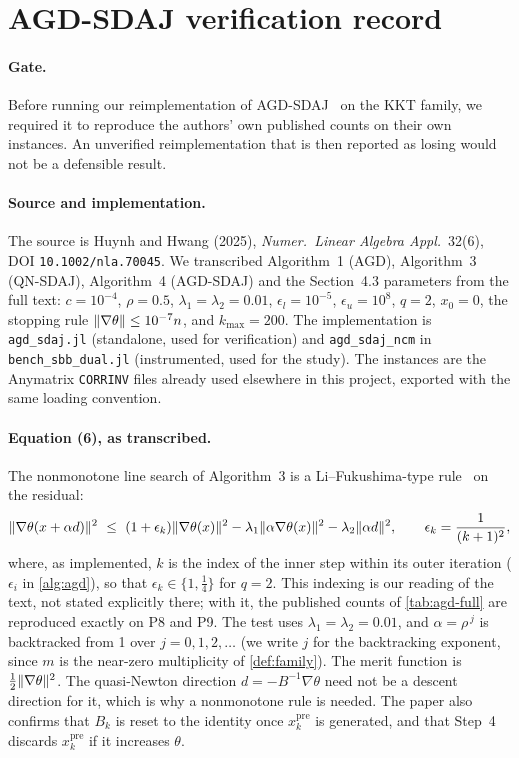 \section{AGD-SDAJ verification record}\label{app:agd}

\paragraph{Gate.}
Before running our reimplementation of AGD-SDAJ~\cite{huynh2025accelerated} on the
KKT family, we required it to reproduce the authors' own published counts on
their own instances. An unverified reimplementation that is then reported as
losing would not be a defensible result.

\paragraph{Source and implementation.}
The source is Huynh and Hwang (2025), \emph{Numer.\ Linear Algebra Appl.}\
32(6), DOI \texttt{10.1002/nla.70045}. We transcribed Algorithm~1 (AGD),
Algorithm~3 (QN-SDAJ), Algorithm~4 (AGD-SDAJ) and the Section~4.3 parameters
from the full text: $c=10^{-4}$, $\rho=0.5$, $\lambda_1=\lambda_2=0.01$,
$\epsilon_l=10^{-5}$, $\epsilon_u=10^{8}$, $q=2$, $x_0=0$, the stopping rule
$\lVert \nabla\theta\rVert\le10^{-7}n$, and $k_{\max}=200$. The implementation is
\texttt{agd\_sdaj.jl} (standalone, used for verification) and
\texttt{agd\_sdaj\_ncm} in \texttt{bench\_sbb\_dual.jl} (instrumented, used for
the study). The instances are the Anymatrix \texttt{CORRINV} files already used
elsewhere in this project, exported with the same loading convention.

\paragraph{Equation (6), as transcribed.}
The nonmonotone line search of Algorithm~3 is a Li--Fukushima-type
rule~\cite{li2000derivative} on the residual:
\begin{equation}\label{eq:hh6}
  \nrm{\nabla\theta(x+\alpha d)}^2\ \le\ (1+\epsilon_k)\nrm{\nabla\theta(x)}^2
  -\lambda_1\nrm{\alpha\nabla\theta(x)}^2-\lambda_2\nrm{\alpha d}^2,
  \qquad \epsilon_k=\frac{1}{(k+1)^2},
\end{equation}
where, as implemented, $k$ is the index of the inner step within its outer
iteration ($\epsilon_i$ in \cref{alg:agd}), so that
$\epsilon_k\in\{1,\tfrac14\}$ for $q=2$. This indexing is our reading of the
text, not stated explicitly there; with it, the published counts of
\cref{tab:agd-full} are reproduced exactly on P8 and P9. The test uses
$\lambda_1=\lambda_2=0.01$, and $\alpha=\rho^{\,j}$ is backtracked from 1 over
$j=0,1,2,\dots$ (we write $j$ for the backtracking exponent, since $m$ is the
near-zero multiplicity of \cref{def:family}). The
merit function is $\tfrac12\lVert \nabla\theta\rVert^2$. The quasi-Newton direction
$d=-B^{-1}\nabla\theta$ need not be a descent direction for it, which is why a
nonmonotone rule is needed. The paper also confirms that $B_k$ is reset to the
identity once $x_k^{\mathrm{pre}}$ is generated, and that Step~4 discards
$x_k^{\mathrm{pre}}$ if it increases $\theta$.

